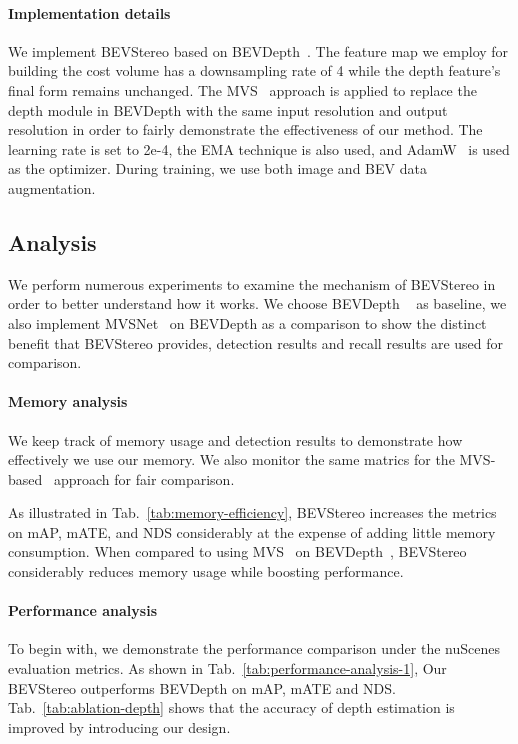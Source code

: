 \documentclass[letterpaper]{article} \usepackage[]{aaai23}  \usepackage{times}  \usepackage{helvet}  \usepackage{courier}  \usepackage[hyphens]{url}  \usepackage{graphicx} \urlstyle{rm} \def\UrlFont{\rm}  \usepackage{natbib}  \usepackage{caption} \frenchspacing  \setlength{\pdfpagewidth}{8.5in} \setlength{\pdfpageheight}{11in} \usepackage{algorithm}
\begin{document}
\paragraph{Implementation details}
We implement BEVStereo based on BEVDepth~\cite{li2022bevdepth}. The feature map we employ for building the cost volume has a downsampling rate of 4 while the depth feature's final form remains unchanged. The MVS~\cite{yao2018mvsnet} approach is applied to replace the depth module in BEVDepth with the same input resolution and output resolution in order to fairly demonstrate the effectiveness of our method. The learning rate is set to 2e-4, the EMA technique is also used, and AdamW~\cite{adamw} is used as the optimizer. During training, we use both image and BEV data augmentation.
\subsection{Analysis}
We perform numerous experiments to examine the mechanism of BEVStereo in order to better understand how it works. We choose BEVDepth ~\cite{li2022bevdepth} as baseline, we also implement MVSNet~\cite{yao2018mvsnet} on BEVDepth as a comparison to  show the distinct benefit that BEVStereo provides,  detection results and recall results are used for comparison.
\paragraph{Memory analysis}
We keep track of memory usage and detection results to demonstrate how effectively we use our memory. We also monitor the same matrics for the MVS-based~\cite{yao2018mvsnet} approach for fair comparison.

As illustrated in Tab.~\ref{tab:memory-efficiency}, BEVStereo increases the metrics on mAP, mATE, and NDS considerably at the expense of adding little memory consumption. When compared to using MVS~\cite{yao2018mvsnet} on BEVDepth~\cite{li2022bevdepth}, BEVStereo considerably reduces memory usage while boosting performance.

\paragraph{Performance analysis}
To begin with, we demonstrate the performance comparison under the nuScenes~\cite{caesar2020nuscenes} evaluation metrics. As shown in Tab.~\ref{tab:performance-analysis-1}, Our BEVStereo outperforms BEVDepth on mAP, mATE and NDS. Tab.~\ref{tab:ablation-depth} shows that the accuracy of depth estimation is improved by introducing our design.
\end{document}
